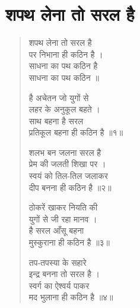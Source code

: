 \section{शपथ लेना तो सरल है}
\label{sec:shapath}

\begin{verse}

शपथ लेना तो सरल है\\
पर निभाना ही कठिन है ।\\
साधना का पथ कठिन है\\
साधना का पथ कठिन ॥

है अचेतन जो युगों से\\
लहर के अनुकूल बहते ।\\
साथ बहना है सरल\\
प्रतिकूल बहना ही कठिन है ॥१॥

शलभ बन जलना सरल है\\
प्रेम की जलती शिखा पर ।\\
स्वयं को तिल-तिल जलाकर\\
दीप बनना ही कठिन है ॥२॥

ठोकरें खाकर नियति की\\
युगों से जी रहा मानव ।\\
है सरल आँसू बहना\\
मुस्कुराना ही कठिन है ॥३॥

तप-तपस्या के सहारे\\
इन्द्र बनना तो सरल है ।\\
स्वर्ग का ऐश्वर्य पाकर\\
मद भुलाना ही कठिन है ॥४॥

\end{verse}
